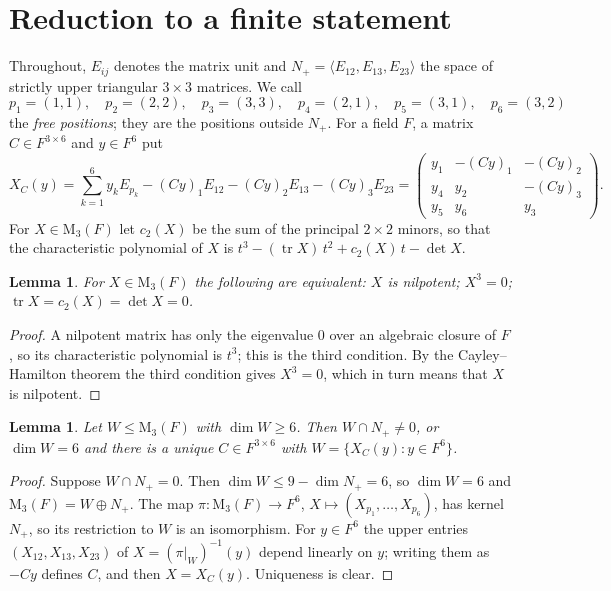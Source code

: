 \documentclass[11pt]{amsart}
\newtheorem{lemma}[theorem]{Lemma}
\theoremstyle{definition}
\theoremstyle{remark}
\numberwithin{equation}{section}
\newcommand{\M}{\mathrm{M}}
\newcommand{\tr}{\operatorname{tr}}
\begin{document}
\section{Reduction to a finite statement}\label{sec:reduction}

Throughout, $E_{ij}$ denotes the matrix unit and $N_+=\langle E_{12},E_{13},E_{23}\rangle$ the space of strictly upper triangular $3\times 3$ matrices. We call
\[
p_1=(1,1),\quad p_2=(2,2),\quad p_3=(3,3),\quad p_4=(2,1),\quad p_5=(3,1),\quad p_6=(3,2)
\]
the \emph{free positions}; they are the positions outside $N_+$. For a field $F$, a matrix $C\in F^{3\times6}$ and $y\in F^6$ put
\begin{equation}\label{eq:XC}
X_C(y)=\sum_{k=1}^{6}y_k E_{p_k}-(Cy)_1E_{12}-(Cy)_2E_{13}-(Cy)_3E_{23}
=\begin{pmatrix} y_1&-(Cy)_1&-(Cy)_2\\ y_4&y_2&-(Cy)_3\\ y_5&y_6&y_3\end{pmatrix}.
\end{equation}
For $X\in\M_3(F)$ let $c_2(X)$ be the sum of the principal $2\times2$ minors, so that the characteristic polynomial of $X$ is $t^3-(\tr X)\,t^2+c_2(X)\,t-\det X$.

\begin{lemma}\label{lem:nil}
For $X\in\M_3(F)$ the following are equivalent: $X$ is nilpotent; $X^3=0$; $\tr X=c_2(X)=\det X=0$.
\end{lemma}

\begin{proof}
A nilpotent matrix has only the eigenvalue $0$ over an algebraic closure of $F$, so its characteristic polynomial is $t^3$; this is the third condition. By the Cayley--Hamilton theorem the third condition gives $X^3=0$, which in turn means that $X$ is nilpotent.
\end{proof}

\begin{lemma}\label{lem:graph}
Let $W\le\M_3(F)$ with $\dim W\ge6$. Then $W\cap N_+\ne0$, or $\dim W=6$ and there is a unique $C\in F^{3\times6}$ with $W=\{X_C(y):y\in F^6\}$.
\end{lemma}

\begin{proof}
Suppose $W\cap N_+=0$. Then $\dim W\le 9-\dim N_+=6$, so $\dim W=6$ and $\M_3(F)=W\oplus N_+$. The map $\pi\colon\M_3(F)\to F^6$, $X\mapsto (X_{p_1},\dots,X_{p_6})$, has kernel $N_+$, so its restriction to $W$ is an isomorphism. For $y\in F^6$ the upper entries $(X_{12},X_{13},X_{23})$ of $X=(\pi|_W)^{-1}(y)$ depend linearly on $y$; writing them as $-Cy$ defines $C$, and then $X=X_C(y)$. Uniqueness is clear.
\end{proof}
\end{document}
